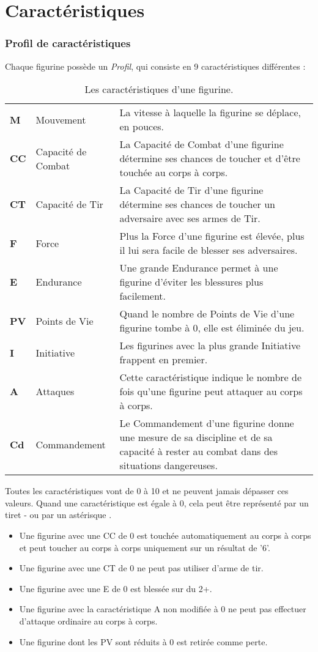 
\part{Caractéristiques}

\section{Profil de caractéristiques}

Chaque figurine possède un \emph{Profil}, qui consiste en 9 caractéristiques différentes : 
\begin{table}[!htbp]
\centering
\begin{tabular}{M{1,5cm}M{3cm}M{10cm}}
\textbf{M} & Mouvement & La vitesse à laquelle la figurine se déplace, en pouces. \tabularnewline
\textbf{CC} & Capacité de Combat & La Capacité de Combat d’une figurine détermine ses chances de toucher et d’être touchée au corps à corps. \tabularnewline
\textbf{CT} & Capacité de Tir & La Capacité de Tir d'une figurine détermine ses chances de toucher un adversaire avec ses armes de Tir. \tabularnewline
\textbf{F} & Force & Plus la Force d'une figurine est élevée, plus il lui sera facile de blesser ses adversaires. \tabularnewline
\textbf{E} & Endurance & Une grande Endurance permet à une figurine d'éviter les blessures plus facilement. \tabularnewline
\textbf{PV} & Points de Vie & Quand le nombre de Points de Vie d'une figurine tombe à 0, elle est éliminée du jeu. \tabularnewline
\textbf{I} & Initiative & Les figurines avec la plus grande Initiative frappent en premier. \tabularnewline
\textbf{A} & Attaques & Cette caractéristique indique le nombre de fois qu'une figurine peut attaquer au corps à corps. \tabularnewline
\textbf{Cd} & Commandement & Le Commandement d'une figurine donne une mesure de sa discipline et de sa capacité à rester au combat dans des situations dangereuses. \tabularnewline
\end{tabular}
\caption{\label{table/caractéristiques}Les caractéristiques d'une figurine.}
\end{table}


Toutes les caractéristiques vont de 0 à 10 et ne peuvent jamais dépasser ces valeurs. Quand une caractéristique est égale à 0, cela peut être représenté par un tiret \og - \fg ou par un astérisque \og * \fg.

\begin{itemize}[label={-}]
\item Une figurine avec une CC de 0 est touchée automatiquement au corps à corps et peut toucher au corps à corps uniquement sur un résultat de '6'.
\item Une figurine avec une CT de 0 ne peut pas utiliser d'arme de tir.
\item Une figurine avec une E de 0 est blessée sur du 2+.
\item Une figurine avec la caractéristique A non modifiée à 0 ne peut pas effectuer d'attaque ordinaire au corps à corps.
\item Une figurine dont les PV sont réduits à 0 est retirée comme perte.
\end{itemize}

